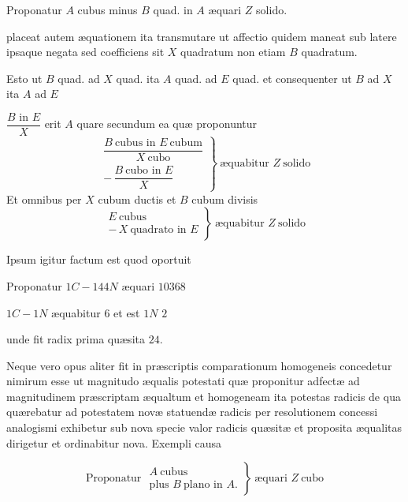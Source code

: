 \documentclass[11pt,a4paper]{article}
\begin{document}
Proponatur $A$ cubus minus $B$ quad. in $A$ æquari $Z$ solido.

placeat autem æquationem ita transmutare ut affectio quidem maneat sub latere ipsaque negata sed coefficiens sit $X$ quadratum non etiam $B$ quadratum.

Esto ut $B$ quad. ad $X$ quad. ita $A$ quad. ad $E$ quad. et consequenter ut $B$ ad $X$ ita $A$ ad $E$

$\dfrac{B \text{ in } E}{X}$ erit $A$ quare secundum ea quæ proponuntur
\[ \left.\begin{array}{l} \dfrac{B\ \text{cubus in } E\ \text{cubum}}{X\ \text{cubo}} \\[2ex] -\,\dfrac{B\ \text{cubo in } E}{X} \end{array}\right\}\ \text{æquabitur } Z\ \text{solido} \]
Et omnibus per $X$ cubum ductis et $B$ cubum divisis
\[ \left.\begin{array}{l} E\ \text{cubus} \\ -\,X\ \text{quadrato in } E \end{array}\right\}\ \text{æquabitur } Z\ \text{solido} \]

Ipsum igitur factum est quod oportuit

Proponatur $1C - 144N$ æquari $10368$

$1C - 1N$ æquabitur $6$ et est $1N$ $2$

unde fit radix prima quæsita $24$.

Neque vero opus aliter fit in præscriptis comparationum homogeneis concedetur nimirum esse ut magnitudo æqualis potestati quæ proponitur adfectæ ad magnitudinem præscriptam æqualtum et homogeneam ita potestas radicis de qua quærebatur ad potestatem novæ statuendæ radicis  per resolutionem concessi analogismi exhibetur sub nova specie valor radicis quæsitæ et proposita æqualitas dirigetur et ordinabitur nova. Exempli causa

\[ \text{Proponatur } \left.\begin{array}{l} A\ \text{cubus} \\ \text{plus } B\ \text{plano in } A. \end{array}\right\}\ \text{æquari } Z\ \text{cubo} \]
\end{document}
